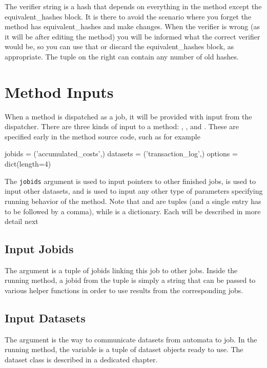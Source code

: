 The verifier string is a hash that depends on everything in the method
except the equivalent\_hashes block. It is there to avoid the scenario
where you forget the method has equivalent\_hashes and make changes. When
the verifier is wrong (as it will be after editing the method) you will be
informed what the correct verifier would be, so you can use that or discard
the equivalent\_hashes block, as appropriate. The tuple on the right can
contain any number of old hashes.



\section{Method Inputs}

When a method is dispatched as a job, it will be provided with input
from the dispatcher.  There are three kinds of input to a method:
\jobids, \datasets, and \options.  These are specified early in the
method source code, such as for example
\begin{python}
jobids = ('accumulated_costs',)
datasets = ('transaction_log',)
options = dict(length=4)
\end{python}
The \texttt{jobids} argument is used to input pointers to other
finished jobs, \datasets is used to input other datasets, and \options
is used to input any other type of parameters specifying running
behavior of the method.  Note that \jobids and \datasets are tuples
(and a single entry has to be followed by a comma), while \options is
a dictionary.  Each will be described in more detail next



\subsection{Input Jobids}
The \jobids argument is a tuple of jobids linking this job to other
jobs.  Inside the running method, a jobid from the \jobids tuple is
simply a string that can be passed to various helper functions in
order to use results from the corresponding jobs.



\subsection{Input Datasets}
The \datasets argument is the way to communicate datasets from
automata to job.  In the running method, the \datasets variable is a
tuple of dataset objects ready to use.  The dataset class is described
in a dedicated chapter.




